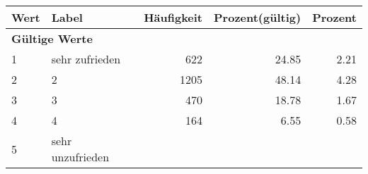      \begin{longtable}{lXrrr}
     \toprule
     \textbf{Wert} & \textbf{Label} & \textbf{Häufigkeit} & \textbf{Prozent(gültig)} & \textbf{Prozent} \\
     \endhead
     \midrule
     \multicolumn{5}{l}{\textbf{Gültige Werte}}\\

     1 &
     \multicolumn{1}{X}{ sehr zufrieden   } &


       \num{622} &
       \num[round-mode=places,round-precision=2]{24,85} &
         \num[round-mode=places,round-precision=2]{2,21} \\

     2 &
     \multicolumn{1}{X}{ 2   } &


       \num{1205} &
       \num[round-mode=places,round-precision=2]{48,14} &
         \num[round-mode=places,round-precision=2]{4,28} \\

     3 &
     \multicolumn{1}{X}{ 3   } &


       \num{470} &
       \num[round-mode=places,round-precision=2]{18,78} &
         \num[round-mode=places,round-precision=2]{1,67} \\

     4 &
     \multicolumn{1}{X}{ 4   } &


       \num{164} &
       \num[round-mode=places,round-precision=2]{6,55} &
         \num[round-mode=places,round-precision=2]{0,58} \\

     5 &
     \multicolumn{1}{X}{ sehr unzufrieden   } &



\end{longtable}
